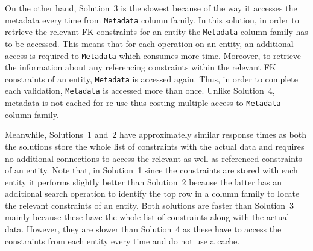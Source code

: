 On the other hand,  Solution~3 is the slowest  because of the
way it accesses the metadata every time from \texttt{Metadata} column family. 
In this solution,  in order to retrieve the relevant \ac{FK} constraints for
an entity the \texttt{Metadata} column family has to be accessed.  This means
that for each operation on an entity,  an additional access is required to
\texttt{Metadata} which consumes more time. 
Moreover,  to retrieve the information about any referencing constraints within
the relevant \ac{FK} constraints of an entity,  \texttt{Metadata} is accessed
again. 
Thus,  in order to
complete each validation,  \texttt{Metadata} is accessed more than once. 
Unlike Solution~4,  metadata is not cached for re-use thus costing multiple
access to \texttt{Metadata} column family. 

Meanwhile,  Solutions~1 and~2 have approximately similar response times as both
the solutions store the whole list of constraints with the actual data and 
requires no additional connections to access the relevant as well as
referenced constraints of an entity.  Note that, in Solution~1 since the constraints
are stored with each entity it performs slightly better than
Solution~2 because the latter has an additional search operation to identify the
top row in a column family to locate the relevant constraints of an entity.  Both
solutions are faster than Solution~3 mainly because these have the whole
list of constraints along with the actual data.  However,  they are slower than
Solution~4 as these have to access the constraints from each entity every time and do not
use a cache. 



